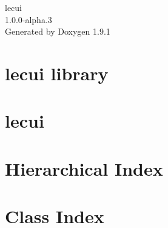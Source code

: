 \let\mypdfximage\pdfximage\def\pdfximage{\immediate\mypdfximage}\documentclass[twoside]{book}
\newcommand{\+}{\discretionary{\mbox{\scriptsize$\hookleftarrow$}}{}{}}
\newcommand{\clearemptydoublepage}{%
  \newpage{\pagestyle{empty}\cleardoublepage}%
}
\begin{document}
\raggedbottom

\hypersetup{pageanchor=false,
             bookmarksnumbered=true,
             pdfencoding=unicode
            }
\begin{titlepage}
\vspace*{7cm}
\begin{center}%
{\Large lecui \\[1ex]\large 1.\+0.\+0-\/alpha.\+3 }\\
\vspace*{1cm}
{\large Generated by Doxygen 1.9.1}\\
\end{center}
\end{titlepage}
\clearemptydoublepage
{}
\tableofcontents
\clearemptydoublepage
{}
\hypersetup{pageanchor=true}

\chapter{lecui library}
\label{md__l_i_c_e_n_s_e}

\chapter{lecui}
\label{md__r_e_a_d_m_e}

\chapter{Hierarchical Index}

\chapter{Class Index}

\end{document}
